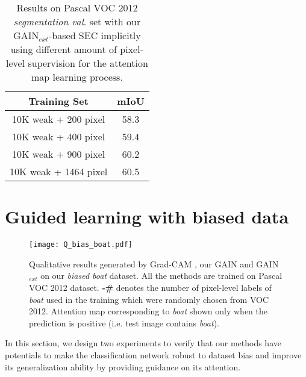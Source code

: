 \documentclass[10pt,twocolumn,letterpaper]{article}
\begin{document}
\begin{table}
\begin{center}
\begin{tabular}{cc}
\hline
Training Set & mIoU \\
\hline\hline
 10K weak + 200 pixel & 58.3\\
 10K weak + 400 pixel & 59.4\\
 10K weak + 900 pixel & 60.2\\
 10K weak + 1464 pixel & 60.5\\
\hline
\end{tabular}
\end{center}
\caption{Results on Pascal VOC 2012 \emph{segmentation val}. set with our GAIN$_{ext}$-based SEC implicitly using different amount of pixel-level supervision for the attention map learning process.}
\label{table:voc_val_different_percent_supervision}
\end{table}





\section{Guided learning with biased data}\label{section:human_guided_classification_experiment}


\begin{figure*}%
\centering
\texttt{[image: Q\_bias\_boat.pdf]} %
\caption{Qualitative results generated by Grad-CAM \cite{grad-cam}, our GAIN and GAIN$_{ext}$ on our \emph{biased boat} dataset. All the methods are trained on Pascal VOC 2012 dataset. \textbf{-\# } denotes the number of pixel-level labels of \emph{boat} used in the training which were randomly chosen from VOC 2012. Attention map corresponding to \emph{boat} shown only when the prediction is positive (i.e. test image contains \emph{boat}).}
\label{fig:Q_result_bias_boat}
\end{figure*}

In this section, we design two experiments to verify that our methods have potentials to make the classification network robust to dataset bias and improve its generalization ability by providing guidance on its attention.
\end{document}
